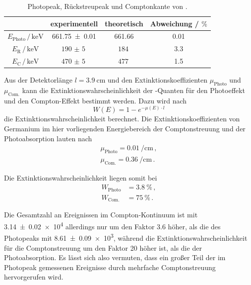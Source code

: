 \begin{table}[H]
  \centering
  \caption{Photopeak, Rückstreupeak und Comptonkante von .}
  \label{tab:Cs_Comptonkontinuum}
  \begin{tabular}{cccc}
    \toprule
    & experimentell & theoretisch & Abweichung / $\si{\percent}$ \\
    \midrule
    $E_\text{Photo} \, / \, \si{\kilo\electronvolt}$ & \SI{661.75(1)}{} & \num{661.66} & \num{0.01} \\
    $E_\text{R} \,/\, \si{\kilo\electronvolt}$ &  $\SI{190(5)}{}$ & $\SI{184}{}$ & \num{3.3} \\
    $E_\text{C} \,/\, \si{\kilo\electronvolt}$ &  $\SI{470(5)}{}$ & $\SI{477}{}$ & \num{1.5} \\
    \bottomrule
  \end{tabular}
\end{table}

Aus der Detektorlänge $l= \SI{3.9}{\centi\meter}$ und den Extinktionskoeffizienten $\mu_\text{Photo}$ und $\mu_\text{Com.}$ kann die Extinktionswahrscheinlichkeit der -Quanten für den Photoeffekt und den Compton-Effekt bestimmt werden.
Dazu wird nach
\begin{equation*}
  W(E) = 1 - e^{-\mu(E) \cdot l}
\end{equation*}
die Extinktionswahrscheinlichkeit berechnet.
Die Extinktionskoeffizienten von Germanium im hier vorliegenden Energiebereich der Comptonstreuung und der Photoabsorption lauten nach \cite{nist}
\begin{align*}
  \mu_\text{Photo} = \SI{0.01}{\per\centi\meter} \, , \\
  \mu_\text{Com.} = \SI{0.36}{\per\centi\meter} \, .
\end{align*}

Die Extinktionswahrscheinlichkeit liegen somit bei
\begin{align*}
  W_\text{Photo} &= \SI{3.8}{\percent} \, , \\
  W_\text{Com.} &= \SI{75}{\percent} \, .
\end{align*}

Die Gesamtzahl an Ereignissen im Compton-Kontinuum ist mit \num{3.14(2)e4} allerdings nur um den Faktor \num{3.6} höher, als die des Photopeaks mit \num{8.61(9)e3}, während die Extinktionswahrscheinlichkeit für die Comptonstreuung um den Faktor 20 höher ist, als die der Photoabsorption.
Es lässt sich also vermuten, dass ein großer Teil der im Photopeak gemessenen Ereignisse durch mehrfache Comptonstreuung hervorgerufen wird.

